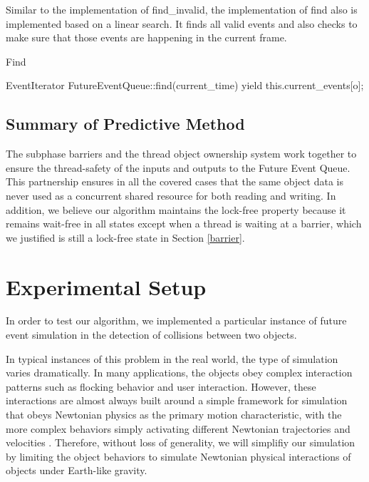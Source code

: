 \documentclass[conference]{IEEEtran}
\begin{document}
Similar to the implementation of find\_invalid, the implementation of find also is implemented based on a linear search.  It finds all valid events
and also checks to make sure that those events are happening in the current frame.

\begin{algorithm}
\caption{Find}
\begin{algorithmic}
\STATE EventIterator FutureEventQueue::find(current\_time)
		\STATE {}
		\STATE yield this.current\_events[o];
	\ENDIF
\ENDFOR
\end{algorithmic}
\end{algorithm}

\subsection{Summary of Predictive Method}
	The subphase barriers and the thread object ownership system work together to ensure the thread-safety of the inputs and outputs to the Future Event Queue.
This partnership ensures in all the covered cases that the same object data is never used as a concurrent shared resource for both reading and writing.  In addition, we believe our algorithm maintains
the lock-free property because it remains wait-free in all states except when a thread is waiting at a barrier, which we justified is still a lock-free state in Section \ref{barrier}.

\section{Experimental Setup}%

In order to test our algorithm, we implemented a particular instance of future event simulation in the detection of collisions between two objects.

In typical instances of this problem in the real world, the type of simulation varies dramatically. In many applications, the objects obey complex interaction patterns such as flocking behavior and user interaction.  However, these interactions are almost always built around a simple framework for simulation that obeys Newtonian physics as the primary motion characteristic, with the more complex
behaviors simply activating different Newtonian trajectories and velocities \cite{Jadbabaie02coordinationof}.  Therefore, without loss of generality, we will simplifiy our simulation by limiting the object behaviors to simulate Newtonian physical interactions of objects under Earth-like gravity.
\end{document}
